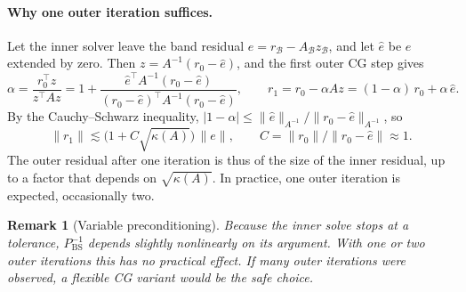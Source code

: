 \documentclass[11pt,a4paper]{article}
\newtheorem{remark}{Remark}
\newcommand{\B}{\mathcal{B}}
\newcommand{\PBS}{P_{\mathrm{BS}}}
\begin{document}
\paragraph{Why one outer iteration suffices.}
Let the inner solver leave the band residual $e = r_\B - A_\B z_\B$, and let $\hat e$ be $e$ extended
by zero. Then $z = A^{-1}(r_0-\hat e)$, and the first outer CG step gives
\begin{equation}
  \alpha = \frac{r_0^\top z}{z^\top A z} = 1 + \frac{\hat e^\top A^{-1}(r_0-\hat e)}{(r_0-\hat e)^\top A^{-1}(r_0-\hat e)},
  \qquad
  r_1 = r_0 - \alpha A z = (1-\alpha)\,r_0 + \alpha\,\hat e .
\end{equation}
By the Cauchy--Schwarz inequality, $|1-\alpha|\le \|\hat e\|_{A^{-1}}/\|r_0-\hat e\|_{A^{-1}}$, so
\begin{equation}
  \|r_1\| \lesssim \bigl(1 + C\sqrt{\kappa(A)}\bigr)\,\|e\|, \qquad C = \|r_0\|/\|r_0-\hat e\| \approx 1.
\end{equation}
The outer residual after one iteration is thus of the size of the inner residual, up to a factor
that depends on $\sqrt{\kappa(A)}$. In practice, one outer iteration is expected, occasionally two.

\begin{remark}[Variable preconditioning]
  Because the inner solve stops at a tolerance, $\PBS^{-1}$ depends slightly nonlinearly on its
  argument. With one or two outer iterations this has no practical effect. If many outer iterations
  were observed, a flexible CG variant would be the safe choice.
\end{remark}
\end{document}
